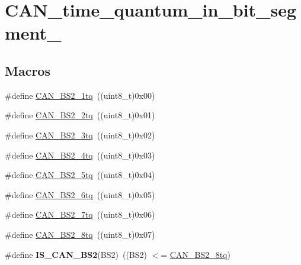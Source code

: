 \hypertarget{group___c_a_n__time__quantum__in__bit__segment__2}{}\section{C\+A\+N\+\_\+time\+\_\+quantum\+\_\+in\+\_\+bit\+\_\+segment\+\_}
\label{group___c_a_n__time__quantum__in__bit__segment__2}
\subsection*{Macros}
\begin{DoxyCompactItemize}
\item 
\#define \hyperlink{group___c_a_n__time__quantum__in__bit__segment__2_gad9af25a3f61df7b09b8d6a5e81d8027e}{C\+A\+N\+\_\+\+B\+S2\+\_\+1tq}~((uint8\+\_\+t)0x00)
\item 
\#define \hyperlink{group___c_a_n__time__quantum__in__bit__segment__2_gac43d82f74990620499f1998187ff3602}{C\+A\+N\+\_\+\+B\+S2\+\_\+2tq}~((uint8\+\_\+t)0x01)
\item 
\#define \hyperlink{group___c_a_n__time__quantum__in__bit__segment__2_gab3d325ce4a5d0eb1ee8ee50ad4ec7e49}{C\+A\+N\+\_\+\+B\+S2\+\_\+3tq}~((uint8\+\_\+t)0x02)
\item 
\#define \hyperlink{group___c_a_n__time__quantum__in__bit__segment__2_gaaff1c1cdd809f185299971c6437f32a0}{C\+A\+N\+\_\+\+B\+S2\+\_\+4tq}~((uint8\+\_\+t)0x03)
\item 
\#define \hyperlink{group___c_a_n__time__quantum__in__bit__segment__2_ga89feba32bcc2e909f858d535edaad101}{C\+A\+N\+\_\+\+B\+S2\+\_\+5tq}~((uint8\+\_\+t)0x04)
\item 
\#define \hyperlink{group___c_a_n__time__quantum__in__bit__segment__2_ga72c3245b794d3238763d1ec319bf386f}{C\+A\+N\+\_\+\+B\+S2\+\_\+6tq}~((uint8\+\_\+t)0x05)
\item 
\#define \hyperlink{group___c_a_n__time__quantum__in__bit__segment__2_ga8005adaef02fb90e400909de08dec031}{C\+A\+N\+\_\+\+B\+S2\+\_\+7tq}~((uint8\+\_\+t)0x06)
\item 
\#define \hyperlink{group___c_a_n__time__quantum__in__bit__segment__2_gaad8dcbb266cf5074bfb67bd7108597c6}{C\+A\+N\+\_\+\+B\+S2\+\_\+8tq}~((uint8\+\_\+t)0x07)
\item 
\hypertarget{group___c_a_n__time__quantum__in__bit__segment__2_ga3f5620b1d094dbd7d2fb8d16f4b187a9}{}\#define {\bfseries I\+S\+\_\+\+C\+A\+N\+\_\+\+B\+S2}(B\+S2)~((B\+S2) $<$= \hyperlink{group___c_a_n__time__quantum__in__bit__segment__2_gaad8dcbb266cf5074bfb67bd7108597c6}{C\+A\+N\+\_\+\+B\+S2\+\_\+8tq})\label{group___c_a_n__time__quantum__in__bit__segment__2_ga3f5620b1d094dbd7d2fb8d16f4b187a9}

\end{DoxyCompactItemize}


